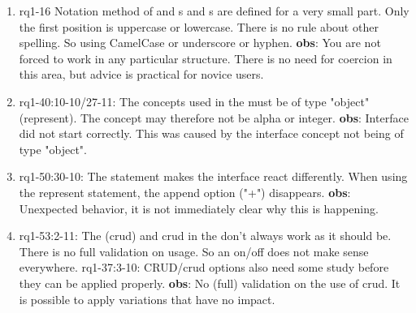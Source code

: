\begin{enumerate}
    
    \item rq1-16 Notation method of  and s and s are defined for a very small part.
    Only the first position is uppercase or lowercase.
    There is no rule about other spelling.
    So using CamelCase or underscore or hyphen.
    \newline\textbf{obs}: You are not forced to work in any particular structure.
    There is no need for coercion in this area, but advice is practical for novice users.
     
    \item rq1-40:10-10/27-11: The concepts used in the  must be of type "object" (represent).
    The concept may therefore not be alpha or integer.
    \newline\textbf{obs}: Interface did not start correctly.
    This was caused by the interface concept not being of type "object".
    
    \item rq1-50:30-10: The  statement makes the interface react differently.
    When using the represent statement, the append option ("+") disappears.
    \newline\textbf{obs}: Unexpected behavior, it is not immediately clear why this is happening.
     
    
    \item rq1-53:2-11: The  (\acrlong{crud}) and \acrshort{crud} in the  don't always work as it should be.
    There is no full validation on usage.
    So an on/off does not make sense everywhere.
    \newline rq1-37:3-10: CRUD/crud options also need some study before they can be applied properly.
    \newline\textbf{obs}: No (full) validation on the use of crud.
    It is possible to apply variations that have no impact.
    

\end{enumerate}
